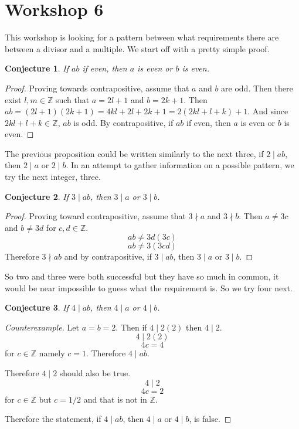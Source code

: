 \documentclass{article}
\newtheorem{conjecture}{Conjecture}
\begin{document}
\section{Workshop 6}
This workshop is looking for a pattern between what requirements there are between a divisor and a multiple. We start off with a pretty simple proof.

\begin{conjecture}
If $ab$ if even, then $a$ is even or $b$ is even.
\end{conjecture}
\begin{proof}
Proving towards contrapositive, assume that $a$ and $b$ are odd. Then there exist $l,m\in\mathbb{Z}$ such that $a=2l+1$ and $b=2k+1$. Then $ab=(2l+1)(2k+1)=4kl+2l+2k+1=2(2kl+l+k)+1$. And since $2kl+l+k\in\mathbb{Z}$, $ab$ is odd. By contrapositive, if $ab$ if even, then $a$ is even or $b$ is even.
\end{proof}

The previous proposition could be written similarly to the next three, if $2\mid ab$, then $2\mid a$ or $2\mid b$. In an attempt to gather information on a possible pattern, we try the next integer, three.

\begin{conjecture}
If $3\mid ab$, then $3\mid a$ or $3\mid b$.
\end{conjecture}
\begin{proof}
Proving toward contrapositive, assume that $3\nmid a$ and $3\nmid b$. Then $a\neq 3c$ and $b \neq 3d$ for $c,d\in\mathbb{Z}$. 
$$ab\neq 3d(3c)$$
$$ab\neq 3(3cd)$$
Therefore $3\nmid ab$ and by contrapositive, if $3\mid ab$, then $3\mid a$ or $3\mid b$.
\end{proof}

So two and three were both successful but they have so much in common, it would be near impossible to guess what the requirement is. So we try four next.

\begin{conjecture}\label{compositediv}
If $4\mid ab$, then $4\mid a$ or $4\mid b$.
\end{conjecture}
\begin{proof}[Counterexample]
Let $a=b=2$. Then if $4\mid 2(2)$ then $4\mid2$. 
$$4\mid 2(2)$$
$$4c=4$$ for $c\in\mathbb{Z}$ namely $c=1$.
Therefore $4\mid ab$.

Therefore $4\mid2$ should also be true. 
$$4\mid 2$$
$$4c=2$$ for $c\in\mathbb{Z}$ but $c=1/2$ and that is not in $\mathbb{Z}$.

Therefore the statement, if $4\mid ab$, then $4\mid a$ or $4\mid b$, is false. 
\end{proof}
\end{document}
